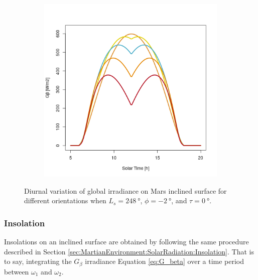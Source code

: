 \begin{figure}[H]
\begin{subfigure}[t]{\subfigureWidth}
  		\label{fig:sub:irradiance-inclined-gamma-c-m180}
  	\end{subfigure}\hfill
	   \begin{subfigure}[t]{\subfigureWidth}
      \centering
  		\includegraphics[height=\graphicsHeight]{sections/martian-environment/plots/diurnal-irradiance-slope-angle-variation-4-for-ls-248-phi-2-tau-05-and-gammac-270.png}
  		\label{fig:sub:irradiance-inclined-gamma-c-m270}
	   \end{subfigure}\hfill
	\caption{Diurnal variation of global irradiance on Mars inclined surface for different orientations when $L_{s} = \SI{248}{\degree}$, $\phi = \SI{-2}{\degree}$, and $\tau = \SI{0}{\degree}$.}
	\label{fig:plot:irradiance-inclined-gamma-c}
\vspace{-2ex}
\end{figure}

\subsubsection{Insolation}
\label{sec:MartianEnvironment:SolarRadiation:InclinedSurface:Insolation}

Insolations on an inclined surface are obtained by following the same procedure described in Section \ref{sec:MartianEnvironment:SolarRadiation:Insolation}. That is to say, integrating the $G_{\beta}$ irradiance Equation \ref{eq:G_beta} over a time period between $\omega_1$ and $\omega_2$.


